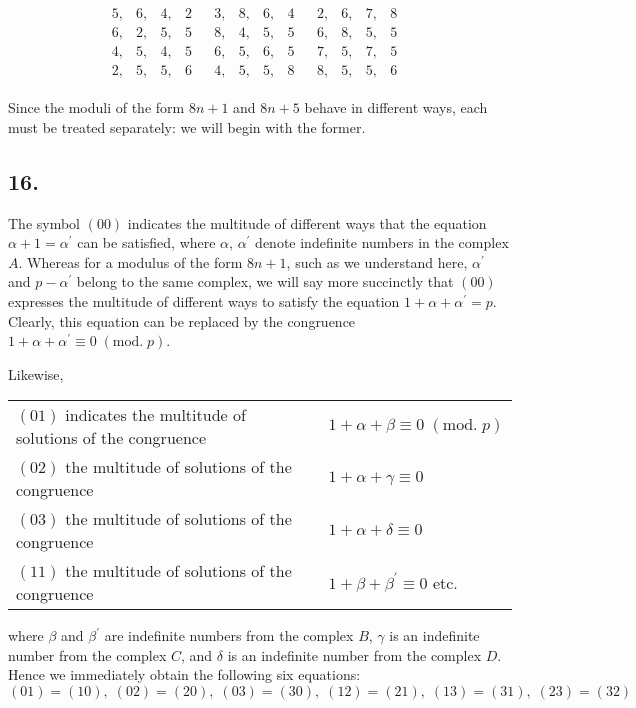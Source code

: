 \documentclass[twoside,12pt]{memoir}
\renewcommand{\pmod}[1]{\;(\textrm{mod.}\;#1)}
\begin{document}
\[\begin{array}{c|c|c|c}
\begin{array}{llll} 5,&6,&4,&2\\6,&2,&5,&5\\4,&5,&4,&5\\2,&5,&5,&6 \end{array} &
\begin{array}{llll} 3,&8,&6,&4\\8,&4,&5,&5\\6,&5,&6,&5\\4,&5,&5,&8 \end{array}&
\begin{array}{llll} 2,&6,&7,&8\\6,&8,&5,&5\\7,&5,&7,&5\\8,&5,&5,&6 \end{array} &
 \end{array} \]

Since the moduli of the form \(8n+1\) and \(8n+5\) behave in different ways, each must be treated separately: we will begin with the former.
%

\subsection*{16.}
 
The symbol \((00)\) indicates the multitude of different ways that the equation \(\alpha+1=\alpha^{\prime}\) can be satisfied, where \(\alpha\), \(\alpha^{\prime}\) denote indefinite numbers in the complex \(A\). Whereas for a modulus of the form \(8n+1\), such as we understand here, \(\alpha^{\prime}\) and \(p-\alpha^{\prime}\) belong to the same complex, we will say more succinctly that \((00)\) expresses the multitude of different ways to satisfy the equation \(1+\alpha+\alpha^{\prime}=p\).  Clearly, this equation can be replaced by the congruence \(1+\alpha+\alpha^{\prime} \equiv 0 \pmod{p}\).
%

Likewise,
\begin{center}
\begin{tabular}{ll}
\((01)\) indicates the multitude of solutions of the congruence & \(1+\alpha+\beta \equiv 0\pmod{p}\) \\
\((02)\) the multitude of solutions of the congruence& \(1+\alpha+\gamma \equiv 0\) \\
\((03)\) the multitude of solutions of the congruence& \(1+\alpha+\delta \equiv 0\) \\
\((11)\) the multitude of solutions of the congruence& \(1+\beta+\beta^{\prime} \equiv 0\) etc{.} \\
\end{tabular}
\end{center}
where \(\beta\) and \(\beta^{\prime}\) are indefinite numbers from the complex \(B\), \(\gamma\) is an indefinite number from the complex \(C\), and \(\delta\) is an indefinite number from the complex \(D\). Hence we immediately obtain the following six equations:
\[(01)=(10), \; (02)=(20), \; (03)=(30), \; (12)=(21), \;(13)=(31), \;(23)=(32)\]
%
\end{document}
